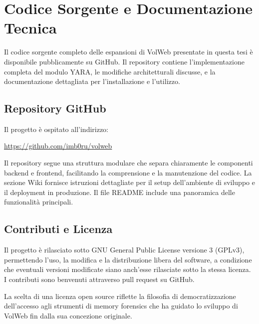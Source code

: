 \chapter{Codice Sorgente e Documentazione Tecnica}

Il codice sorgente completo delle espansioni di VolWeb presentate in questa tesi è disponibile pubblicamente su GitHub. Il repository contiene l'implementazione completa del modulo YARA, le modifiche architetturali discusse, e la documentazione dettagliata per l'installazione e l'utilizzo.

\section{Repository GitHub}

Il progetto è ospitato all'indirizzo:
\begin{center}
\url{https://github.com/imb0ru/volweb}
\end{center}

Il repository segue una struttura modulare che separa chiaramente le componenti backend e frontend, facilitando la comprensione e la manutenzione del codice. La sezione Wiki fornisce istruzioni dettagliate per il setup dell'ambiente di sviluppo e il deployment in produzione. Il file README include una panoramica delle funzionalità principali.

\section{Contributi e Licenza}

Il progetto è rilasciato sotto GNU General Public License versione 3 (GPLv3), permettendo l’uso, la modifica e la distribuzione libera del software, a condizione che eventuali versioni modificate siano anch’esse rilasciate sotto la stessa licenza. I contributi sono benvenuti attraverso pull request su GitHub.

La scelta di una licenza open source riflette la filosofia di democratizzazione dell’accesso agli strumenti di memory forensics che ha guidato lo sviluppo di VolWeb fin dalla sua concezione originale.